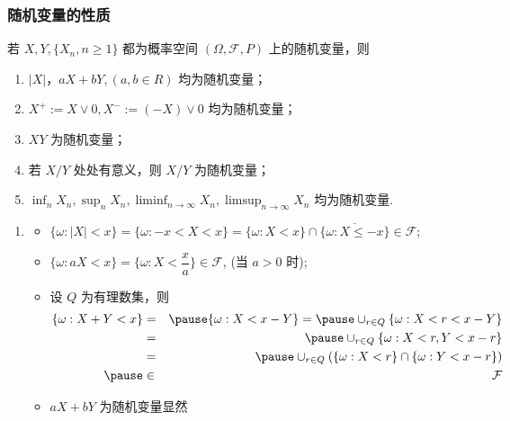 \documentclass[Prob-All.tex]{subfiles}
\begin{document}
\begin{frame}
	\frametitle{随机变量的性质}
	\begin{thm}
		若 $X,Y, \{X_n,n\ge 1\}$ 都为概率空间 $(\Omega,\mathcal{F},P)$ 上的随机变量，则
		\begin{enumerate}[<+-|alert@+>]
			\item $|X|$，$aX+bY,(a,b\in R)$ 均为随机变量；
			\item $X^+:=X\vee 0, X^-:=(-X)\vee 0$ 均为随机变量；
			\item $XY$ 为随机变量；
			\item 若 $X/Y$ 处处有意义，则 $X/Y$ 为随机变量；
			\item $\inf_{n} X_n,\sup_nX_n, \liminf_{n\rightarrow\infty} X_n, \limsup_{n\rightarrow\infty} X_n$ 均为随机变量.
		\end{enumerate}

	\end{thm}

	\pause
	\zheng
	\begin{enumerate}[<+-|alert@+>]
		\item
		      \begin{itemize}[<+-|alert@+>]
			      \item $\{\omega:|X|<x\}=\{\omega:-x<X<x\}=\{\omega:X<x\}\cap\overline{\{\omega:X\le -x\}}\in \mathcal{F}$;
			      \item  $\{\omega:aX<x\}=\{\omega:X<\dfrac{x}{a}\}\in \mathcal{F}$,  (当 $a>0$ 时);
			      \item  设 $Q$ 为有理数集，则
			            \begin{eqnarray*}
				            \{\omega:X+Y<x\}&=&\pause \{\omega:X<x-Y\}=\pause \cup_{r\in Q}\{\omega:X<r<x-Y\}\\
				            &=&\pause \cup_{r\in Q}\{\omega:X<r,Y<x-r\}\\
				            &=&\pause \cup_{r\in Q}(\{\omega:X<r\}\cap \{\omega:Y<x-r\})\\\pause
				            &\in& \mathcal{F}
			            \end{eqnarray*}
			      \item $aX+bY$ 为随机变量显然
		      \end{itemize}
	\end{enumerate}


\end{frame}
\end{document}

